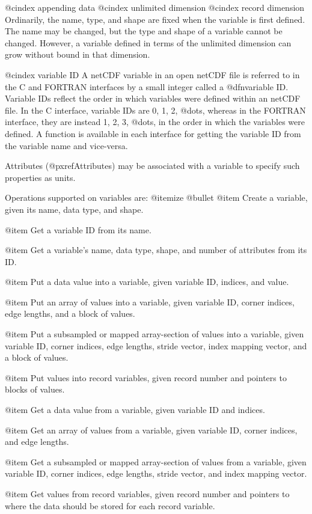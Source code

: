 @cindex appending data
@cindex unlimited dimension
@cindex record dimension
Ordinarily, the name, type, and shape are fixed when the variable is
first defined.  The name may be changed, but the type and shape of a
variable cannot be changed.  However, a variable defined in terms of
the unlimited dimension can grow without bound in that dimension.

@cindex variable ID
A netCDF variable in an open netCDF file is referred to in the C and
FORTRAN interfaces by a small integer called a @dfn{variable ID}.
Variable IDs reflect the order in which variables were defined within an
netCDF file.  In the C interface, variable IDs are 0, 1, 2, @dots{},
whereas in the FORTRAN interface, they are instead 1, 2, 3, @dots{}, in
the order in which the variables were defined.  A function is available
in each interface for getting the variable ID from the variable name and
vice-versa.

Attributes (@pxref{Attributes}) may be associated with a variable to
specify such properties as units.

Operations supported on variables are:
@itemize @bullet
@item
Create a variable, given its name, data type, and shape.

@item
Get a variable ID from its name.

@item
Get a variable's name, data type, shape, and number of attributes from its ID.

@item
Put a data value into a variable, given variable ID, indices, and value.

@item
Put an array of values into a variable, given variable ID, corner
indices, edge lengths, and a block of values.

@item
Put a subsampled or mapped array-section of values into a variable,
given variable ID, corner indices, edge lengths, stride vector, index
mapping vector, and a block of values.

@item
Put values into record variables, given record number and pointers to
blocks of values.

@item
Get a data value from a variable, given variable ID and indices.

@item
Get an array of values from a variable, given variable ID, corner
indices, and edge lengths.

@item
Get a subsampled or mapped array-section of values from a variable,
given variable ID, corner indices, edge lengths, stride vector, and index
mapping vector.

@item
Get values from record variables, given record number and pointers to
where the data should be stored for each record variable.

